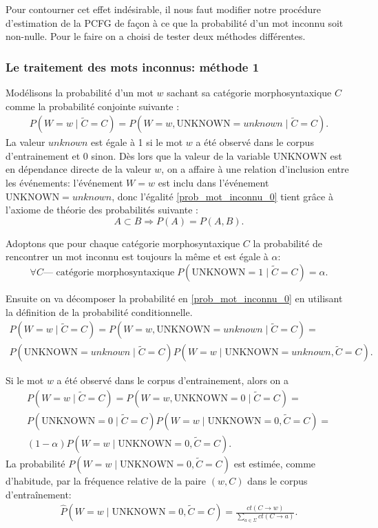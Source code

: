 \documentclass[12pt]{article}
\begin{document}
Pour contourner cet effet ind\'esirable, il nous faut modifier notre proc\'edure
d'estimation de la PCFG de façon \`a ce que la probabilit\'e d'un mot inconnu
soit non-nulle. Pour le faire on a choisi de tester deux m\'ethodes diff\'erentes.

\subsubsection{Le traitement des mots inconnus: m\'ethode 1}

Mod\'elisons la probabilit\'e d'un mot $w$ sachant sa cat\'egorie morphosyntaxique
$C$ comme la probabilit\'e conjointe suivante :
\begin{eqnarray}
\label{prob_mot_inconnu_0}
 P(W = w \mid \tilde{C} = C) = P(W = w, \mathrm{UNKNOWN} = unknown \mid \tilde{C} = C).
\end{eqnarray}
La valeur $unknown$ est \'egale \`a 1 si le mot $w$ a \'et\'e observ\'e dans le
corpus d'entrainement et 0 sinon. D\`es lors que la valeur de la variable
$\mathrm{UNKNOWN}$ est en d\'ependance directe de la valeur $w$, on a affaire \`a
une relation d'inclusion entre les \'ev\'enements: l'\'ev\'enement $W = w$ est
inclu dans l'\'ev\'enement $\mathrm{UNKNOWN} = unknown$, donc l'\'egalit\'e
\ref{prob_mot_inconnu_0} tient gr\^ace \`a l'axiome de th\'eorie des probabilit\'es
suivante :
$$ A \subset B \Rightarrow P(A) = P(A,B).$$

Adoptons que pour chaque cat\'egorie morphosyntaxique $C$ la probabilit\'e de
rencontrer un mot inconnu est toujours la m\^eme et est \'egale \`a $\alpha$:
$$ \forall C \text{--- cat\'egorie morphosyntaxique} \; P(\mathrm{UNKNOWN} = 1 \mid \tilde{C} = C) = \alpha.$$

Ensuite on va d\'ecomposer la probabilit\'e en \ref{prob_mot_inconnu_0} en
utilisant la d\'efinition de la probabilit\'e conditionnelle.
\begin{multline}
\label{prob_mot_inconnu_cond}
 P(W = w \mid \tilde{C} = C) = P(W = w, \mathrm{UNKNOWN} = unknown \mid \tilde{C} = C) = 
 \\
 P(\mathrm{UNKNOWN} = unknown \mid \tilde{C} = C) P(W = w \mid \mathrm{UNKNOWN} = unknown , \tilde{C} = C).
\end{multline}

 Si le mot $w$ a \'et\'e observ\'e dans le corpus d'entrainement, alors on a
\begin{multline}
\label{prob_mot_connu_1}
 P(W = w \mid \tilde{C} = C) = P(W = w, \mathrm{UNKNOWN} = 0 \mid \tilde{C} = C) = 
 \\
 P(\mathrm{UNKNOWN} = 0 \mid \tilde{C} = C) P(W = w \mid \mathrm{UNKNOWN} = 0, \tilde{C} = C) =
 \\
 (1 - \alpha) P(W = w \mid \mathrm{UNKNOWN} = 0, \tilde{C} = C).
\end{multline}
La probabilit\'e $P(W = w \mid \mathrm{UNKNOWN} = 0, \tilde{C} = C)$ est estim\'ee, 
comme d'habitude, par la fr\'equence relative de la paire $(w, C)$ dans le corpus
d'entra\^inement:
\begin{eqnarray*}
\hat{P}(W = w \mid \mathrm{UNKNOWN} = 0, \tilde{C} = C) =
\frac{ct(C \rightarrow w)}{\sum\limits_{a \in \Sigma}{ct(C \rightarrow a)}}.
\end{eqnarray*}
\end{document}
